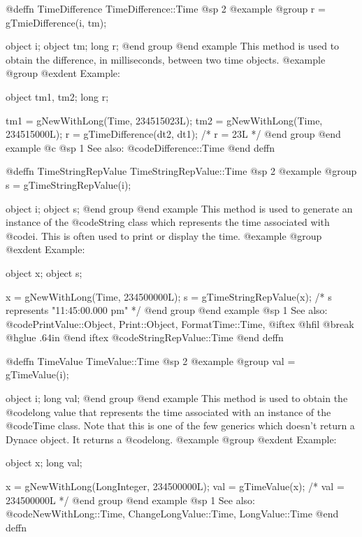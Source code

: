 @deffn {TimeDifference} TimeDifference::Time
@sp 2
@example
@group
r = gTmieDifference(i, tm);

object  i;
object  tm;
long    r;
@end group
@end example
This method is used to obtain the difference, in milliseconds,
between two time objects.  
@example
@group
@exdent Example:

object  tm1, tm2;
long    r;

tm1 = gNewWithLong(Time, 234515023L);
tm2 = gNewWithLong(Time, 234515000L);
r = gTimeDifference(dt2, dt1);    /*  r = 23L  */
@end group
@end example
@c @sp 1
See also:  @code{Difference::Time}
@end deffn







@deffn {TimeStringRepValue} TimeStringRepValue::Time
@sp 2
@example
@group
s = gTimeStringRepValue(i);

object  i;
object  s;
@end group
@end example
This method is used to generate an instance of the @code{String} class
which represents the time associated with @code{i}.  This is often
used to print or display the time.
@example
@group
@exdent Example:

object  x;
object  s;

x = gNewWithLong(Time, 234500000L);
s = gTimeStringRepValue(x);
    /* s represents "11:45:00.000 pm"  */
@end group
@end example
@sp 1
See also:  @code{PrintValue::Object, Print::Object, FormatTime::Time,}
@iftex
@hfil @break @hglue .64in      
@end iftex
@code{StringRepValue::Time}
@end deffn










@deffn {TimeValue} TimeValue::Time
@sp 2
@example
@group
val = gTimeValue(i);

object  i;
long    val;
@end group
@end example
This method is used to obtain the @code{long} value that represents
the time associated with an instance of the @code{Time} class.  Note that
this is one of the few generics which doesn't return a Dynace object.
It returns a @code{long}.
@example
@group
@exdent Example:

object  x;
long    val;

x = gNewWithLong(LongInteger, 234500000L);
val = gTimeValue(x);    /*  val = 234500000L  */
@end group
@end example
@sp 1
See also:  @code{NewWithLong::Time, ChangeLongValue::Time, LongValue::Time}
@end deffn










